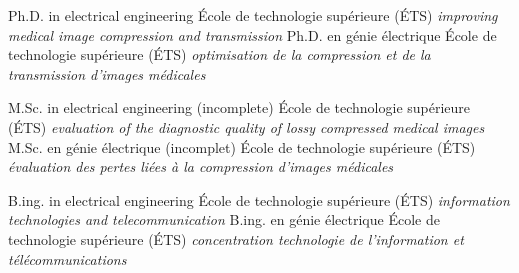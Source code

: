 \documentclass[print]{friggeri-cv}
\begin{document}
\begin{cvfootnote}
\end{cvfootnote}



\begin{entrylist}
  \engfr
  { {Ph.D. in electrical engineering} {École de technologie supérieure {\scriptsize (ÉTS)}} {\emph{improving medical image compression and transmission}}}
  { {Ph.D. en génie électrique} {École de technologie supérieure {\scriptsize (ÉTS)}} {\emph{optimisation de la compression et de la transmission d'images médicales}}}

  \engfr
  { {M.Sc. in electrical engineering (incomplete\textsuperscript{\tiny\textdaggerdbl})} {École de technologie supérieure {\scriptsize (ÉTS)}} {\emph{evaluation of the diagnostic quality of lossy compressed medical images}}}
  { {M.Sc. en génie électrique (incomplet\textsuperscript{\tiny\textdaggerdbl})} {École de technologie supérieure {\scriptsize (ÉTS)}} {\emph{évaluation des pertes liées à la compression d'images médicales}}}

  \engfr
  { {B.ing. in electrical engineering} {École de technologie supérieure {\scriptsize (ÉTS)}} {\emph{information technologies and telecommunication}}}
  { {B.ing. en génie électrique} {École de technologie supérieure {\scriptsize (ÉTS)}} {\emph{concentration technologie de l'information et télécommunications}}}

\end{entrylist}
\end{document}
